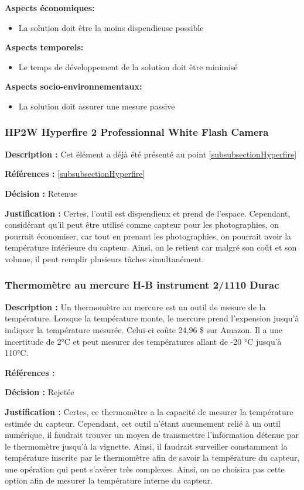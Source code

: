 \textbf{Aspects économiques:}
\begin{itemize}[label = {--}]
    \item La solution doit être la moins dispendieuse possible
\end{itemize}

\textbf{Aspects temporels:}
\begin{itemize}[label = {--}]
    \item Le temps de développement de la solution doit être minimisé
\end{itemize}

\textbf{Aspects socio-environnementaux:}
\begin{itemize}[label = {--}]
    \item La solution doit assurer une mesure passive
\end{itemize}

\subsubsection{HP2W Hyperfire 2 Professionnal White Flash Camera}
\textbf{Description :} Cet élément a déjà été présenté au point \ref{subsubsectionHyperfire}

\textbf{Références :} \ref{subsubsectionHyperfire}

\textbf{Décision :} Retenue

\textbf{Justification :} Certes, l'outil est dispendieux et prend de l'espace. Cependant, considérant qu'il peut être utilisé comme capteur pour les photographies, on pourrait économiser, car tout en prenant les photographies, on pourrait avoir la température intérieure du capteur. Ainsi, on le retient car malgré son coût et son volume, il peut remplir plusieurs tâches simultanément.

\subsubsection{Thermomètre au mercure H-B instrument 2/1110 Durac}
\textbf{Description :} Un thermomètre au mercure est un outil de mesure de la température. Lorsque la température monte, le mercure prend l'expension jusqu'à indiquer la température mesurée. Celui-ci coûte 24,96 \$ sur Amazon. Il a une incertitude de 2°C et peut mesurer des températures allant de -20 °C jusqu'à 110°C.

\textbf{Références :} \cite{mercure}

\textbf{Décision :} Rejetée

\textbf{Justification :} Certes, ce thermomètre a la capacité de mesurer la température estimée du capteur. Cependant, cet outil n'étant aucunement relié à un outil numérique, il faudrait trouver un moyen de transmettre l'information détenue par le thermomètre jusqu'à la vignette. Ainsi, il faudrait surveiller constamment la température inscrite par le thermomètre afin de savoir la température du capteur, une opération qui peut s'avérer très complexes. Ainsi, on ne choisira pas cette option afin de mesurer la température interne du capteur.

